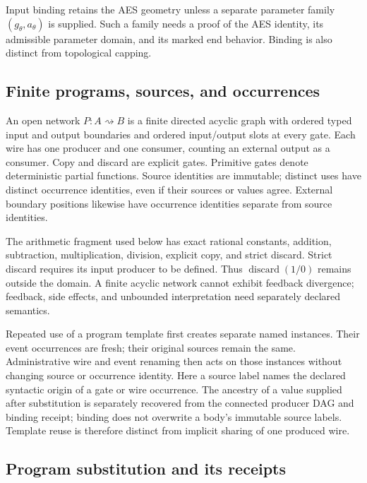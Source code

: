 Input binding retains the AES geometry unless a separate parameter family
$(g_\theta,a_\theta)$ is supplied.  Such a family needs a proof of the AES
identity, its admissible parameter domain, and its marked end behavior.
Binding is also distinct from topological capping.

\subsection{Finite programs, sources, and occurrences}

\begin{definition}
\label{def:strict-finite-network}
An open network $P:A\rightsquigarrow B$ is a finite directed acyclic graph
with ordered typed input and output boundaries and ordered input/output slots
at every gate.  Each wire has one producer and one consumer, counting an
external output as a consumer.  Copy and discard are explicit gates.
Primitive gates denote deterministic partial functions.  Source identities are
immutable; distinct uses have distinct occurrence identities, even if their
sources or values agree.  External boundary positions likewise have occurrence
identities separate from source identities.
\end{definition}

The arithmetic fragment used below has exact rational constants, addition,
subtraction, multiplication, division, explicit copy, and strict discard.
Strict discard requires its input producer to be defined.  Thus
$\operatorname{discard}(1/0)$ remains outside the domain.  A finite acyclic
network cannot exhibit feedback divergence; feedback, side effects, and
unbounded interpretation need separately declared semantics.

Repeated use of a program template first creates separate named instances.
Their event occurrences are fresh; their original sources remain the same.
Administrative wire and event renaming then acts on those instances without
changing source or occurrence identity.  Here a source label names the declared
syntactic origin of a gate or wire occurrence.  The ancestry of a value supplied
after substitution is separately recovered from the connected producer DAG and
binding receipt; binding does not overwrite a body's immutable source labels.
Template reuse is therefore distinct from implicit sharing of one produced wire.

\subsection{Program substitution and its receipts}

